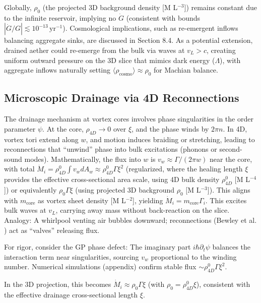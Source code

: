 \documentclass{article}
\begin{document}
Globally, $\rho_0$ (the projected 3D background density [M L$^{-3}$]) remains constant due to the infinite reservoir, implying no $\dot{G}$ (consistent with bounds $|\dot{G}/G| \lesssim 10^{-13} \, \mathrm{yr}^{-1}$). Cosmological implications, such as re-emergent inflows balancing aggregate sinks, are discussed in Section 8.4. As a potential extension, drained aether could re-emerge from the bulk via waves at $v_L > c$, creating uniform outward pressure on the 3D slice that mimics dark energy ($\Lambda$), with aggregate inflows naturally setting $\langle \rho_{\text{cosmo}} \rangle \approx \rho_0$ for Machian balance.

\subsection{Microscopic Drainage via 4D Reconnections}

The drainage mechanism at vortex cores involves phase singularities in the order parameter $\psi$. At the core, $\rho_{4D} \to 0$ over $\xi$, and the phase winds by $2\pi n$. In 4D, vortex tori extend along $w$, and motion induces braiding or stretching, leading to reconnections that ``unwind'' phase into bulk excitations (phonons or second-sound modes). Mathematically, the flux into $w$ is $v_w \approx \Gamma / (2\pi w)$ near the core, with total $\dot{M}_i = \rho_{4D}^0 \int v_w dA_w \approx \rho_{4D}^0 \Gamma \xi^2$ (regularized, where the healing length $\xi$ provides the effective cross-sectional area scale, using 4D bulk density $\rho_{4D}^0$ [M L$^{-4}$]) or equivalently $\rho_0 \Gamma \xi$ (using projected 3D background $\rho_0$ [M L$^{-3}$]). This aligns with $m_{\text{core}}$ as vortex sheet density [M L$^{-2}$], yielding $\dot{M}_i = m_{\text{core}} \Gamma_i$. This excites bulk waves at $v_L$, carrying away mass without back-reaction on the slice. Analogy: A whirlpool venting air bubbles downward; reconnections (Bewley et al. \cite{bewley2008characterization}) act as ``valves'' releasing flux.

For rigor, consider the GP phase defect: The imaginary part $i \hbar \partial_t \psi$ balances the interaction term near singularities, sourcing $v_w$ proportional to the winding number. Numerical simulations (appendix) confirm stable flux $\sim \rho_{4D}^0 \Gamma \xi^2$.

In the 3D projection, this becomes $\dot{M}_i \approx \rho_0 \Gamma \xi$ (with $\rho_0 = \rho_{4D}^0 \xi$), consistent with the effective drainage cross-sectional length $\xi$.
\end{document}
